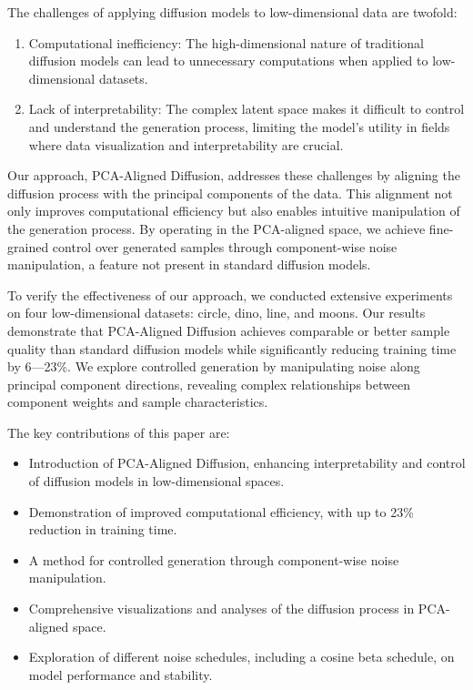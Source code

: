 \documentclass{article} %
\begin{document}
The challenges of applying diffusion models to low-dimensional data are twofold:
\begin{enumerate}
    \item Computational inefficiency: The high-dimensional nature of traditional diffusion models can lead to unnecessary computations when applied to low-dimensional datasets.
    \item Lack of interpretability: The complex latent space makes it difficult to control and understand the generation process, limiting the model's utility in fields where data visualization and interpretability are crucial.
\end{enumerate}

Our approach, PCA-Aligned Diffusion, addresses these challenges by aligning the diffusion process with the principal components of the data. This alignment not only improves computational efficiency but also enables intuitive manipulation of the generation process. By operating in the PCA-aligned space, we achieve fine-grained control over generated samples through component-wise noise manipulation, a feature not present in standard diffusion models.

To verify the effectiveness of our approach, we conducted extensive experiments on four low-dimensional datasets: circle, dino, line, and moons. Our results demonstrate that PCA-Aligned Diffusion achieves comparable or better sample quality than standard diffusion models while significantly reducing training time by 6---23\%. We explore controlled generation by manipulating noise along principal component directions, revealing complex relationships between component weights and sample characteristics.

The key contributions of this paper are:
\begin{itemize}
    \item Introduction of PCA-Aligned Diffusion, enhancing interpretability and control of diffusion models in low-dimensional spaces.
    \item Demonstration of improved computational efficiency, with up to 23\% reduction in training time.
    \item A method for controlled generation through component-wise noise manipulation.
    \item Comprehensive visualizations and analyses of the diffusion process in PCA-aligned space.
    \item Exploration of different noise schedules, including a cosine beta schedule, on model performance and stability.
\end{itemize}
\end{document}
